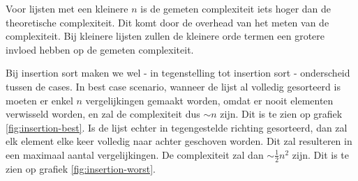 \documentclass[a4paper]{article}
\begin{document}
\par

Voor lijsten met een kleinere $n$ is de gemeten complexiteit iets hoger dan de theoretische complexiteit.
Dit komt door de overhead van het meten van de complexiteit. Bij kleinere lijsten zullen de kleinere orde termen een grotere
invloed hebben op de gemeten complexiteit.

\par

Bij insertion sort maken we wel - in tegenstelling tot insertion sort - onderscheid tussen de cases. In best case scenario, wanneer de lijst al volledig gesorteerd is
moeten er enkel $n$ vergelijkingen gemaakt worden, omdat er nooit elementen verwisseld worden, en zal de complexiteit dus $\sim n$ zijn. Dit is te zien op grafiek \ref{fig:insertion-best}.
Is de lijst echter in tegengestelde richting gesorteerd, dan zal elk element elke keer volledig naar achter geschoven worden. Dit zal resulteren in een maximaal aantal vergelijkingen.
De complexiteit zal dan $\sim \frac{1}{2}n^2$ zijn. Dit is te zien op grafiek \ref{fig:insertion-worst}.
\end{document}
